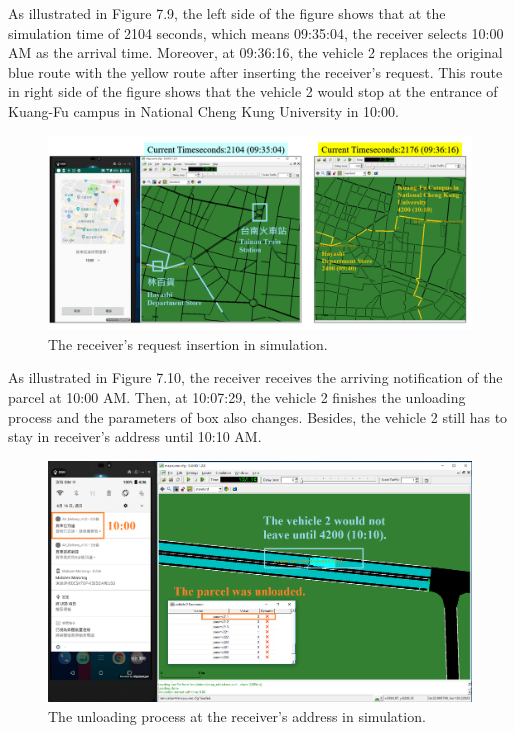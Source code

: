 \documentclass[12pt]{ksthesis}
\begin{document}
\begin{thesis}
{As illustrated in Figure 7.9, the left side of the figure shows that at the simulation time of 2104 seconds, which means 09:35:04, the receiver selects 10:00 AM as the arrival time. 
Moreover, at 09:36:16, the vehicle 2 replaces the original blue route with the yellow route after inserting the receiver’s request. This route in right side of the figure shows that the vehicle 2 would stop at the entrance of Kuang-Fu campus in National Cheng Kung University in 10:00.

\begin{figure}[H]
\centering
\includegraphics[width=1.12\textwidth]{./Thesis_figures/F7-9_receiverRequest.PNG}
\caption{\large The receiver’s request insertion in simulation.}
\vspace{0.5cm}

\label{Fig:Receiver_request}
\end{figure}

As illustrated in Figure 7.10, the receiver receives the arriving notification of the parcel at 10:00 AM. Then, at 10:07:29, the vehicle 2 finishes the unloading process and the parameters of box also changes. Besides, the vehicle 2 still has to stay in receiver’s address until 10:10 AM.

\begin{figure}[H]
\centering
\includegraphics[width=1.12\textwidth]{./Thesis_figures/F7-10_unloadingProcess.PNG}
\caption{\large The unloading process at the receiver’s address in simulation.}
\vspace{0.5cm}
\label{Fig:unloading_request}
\end{figure}









}
\end{thesis}
\end{document}
